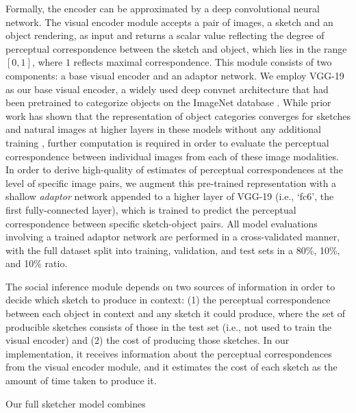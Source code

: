 \documentclass[9pt,twocolumn,twoside]{pnas-new}
\begin{document}
Formally, the encoder can be approximated by a deep convolutional neural network. The visual encoder module accepts a pair of images, a sketch and an object rendering, as input and returns a scalar value reflecting the degree of perceptual correspondence between the sketch and object, which lies in the range $[0,1]$, where $1$ reflects maximal correspondence. This module consists of two components: a base visual encoder and an adaptor network. We employ VGG-19 \cite{simonyan2014very} as our base visual encoder, a widely used deep convnet architecture that had been pretrained to categorize objects on the ImageNet database \cite{deng2009imagenet}. While prior work has shown that the representation of object categories converges for sketches and natural images at higher layers in these models without any additional training \cite{FanCommon2018}, further computation is required in order to evaluate the perceptual correspondence between individual images from each of these image modalities. In order to derive high-quality of estimates of perceptual correspondences at the level of specific image pairs, we augment this pre-trained representation with a shallow \textit{adaptor} network appended to a higher layer of VGG-19 (i.e., `fc6', the first fully-connected layer), which is trained to predict the perceptual correspondence between specific sketch-object pairs. All model evaluations involving a trained adaptor network are performed in a cross-validated manner, with the full dataset split into training, validation, and test sets in a 80\%, 10\%, and 10\% ratio. 

The social inference module depends on two sources of information in order to decide which sketch to produce in context: (1) the perceptual correspondence between each object in context and any sketch it could produce, where the set of producible sketches consists of those in the test set (i.e., not used to train the visual encoder) and (2) the cost of producing those sketches. In our implementation, it receives information about the perceptual correspondences from the visual encoder module, and it estimates the cost of each sketch as the amount of time taken to produce it. 

Our full sketcher model combines  
\end{document}
